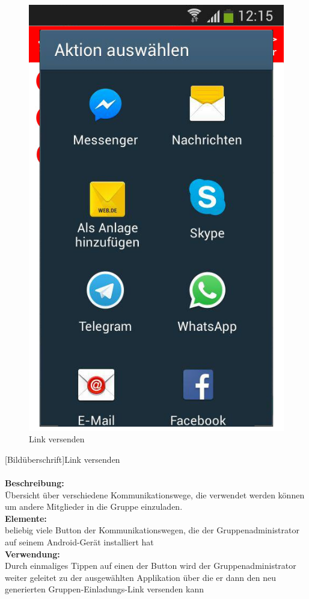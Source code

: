 \begin{figure} [H]
	\caption{Link versenden}
	\includegraphics[scale =0.5]{resources/images/link_versenden.png}
\end{figure}
[Bildüberschrift]Link versenden\\ \\
\textbf{Beschreibung:}\\
Übersicht über verschiedene Kommunikationswege, die verwendet werden können um andere Mitglieder in die Gruppe einzuladen.\\
\textbf{Elemente:}\\
beliebig viele Button der Kommunikationswegen, die der Gruppenadministrator auf seinem Android-Gerät installiert hat\\
\textbf{Verwendung:}\\
Durch einmaliges Tippen auf einen der Button wird der Gruppenadministrator weiter geleitet zu der ausgewählten Applikation über die er dann den neu generierten Gruppen-Einladungs-Link versenden kann\\ \\

